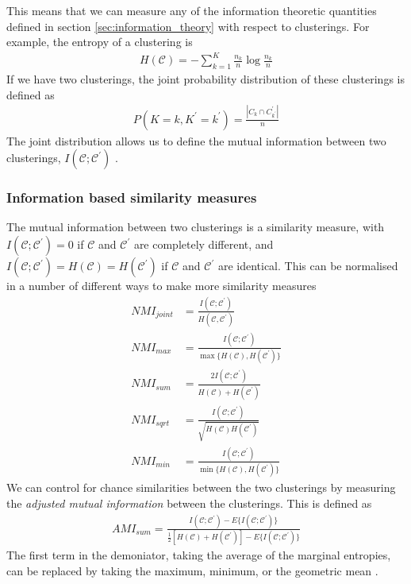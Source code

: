 \documentclass[a4paper,12pt]{article}
\theoremstyle{definition}
\begin{document}
      This means that we can measure any of the information theoretic quantities defined in section \ref{sec:information_theory} with respect to clusterings. For example, the entropy of a clustering is
      \begin{align}
          H(\mathcal{C}) = - \sum_{k=1}^K \frac{n_k}{n} \log \frac{n_k}{n}
      \end{align}
      If we have two clusterings, the joint probability distribution of these clusterings is defined as
      \begin{align}
          P(K=k,K^{\prime}=k^{\prime}) = \frac{|C_k \cap C^{\prime}_{k^\prime}|}{n}
      \end{align}
      The joint distribution allows us to define the mutual information between two clusterings, $I(\mathcal{C};\mathcal{C}^{\prime})$ \cite{meila}.

      \subsubsection{Information based similarity measures}\label{sec:information_similarity_measures}
      The mutual information between two clusterings is a similarity measure, with $I(\mathcal{C};\mathcal{C}^{\prime}) = 0$ if $\mathcal{C}$ and $\mathcal{C}^{\prime}$ are completely different, and $I(\mathcal{C};\mathcal{C}^{\prime}) = H(\mathcal{C}) = H(\mathcal{C}^{\prime})$ if $\mathcal{C}$ and $\mathcal{C}^{\prime}$ are identical. This can be normalised in a number of different ways to make more similarity measures \cite{vinh}
      \begin{align}
          NMI_{joint} &= \frac{I(\mathcal{C};\mathcal{C}^{\prime})}{H(\mathcal{C}, \mathcal{C}^{\prime})} \\
          NMI_{max} &= \frac{I(\mathcal{C};\mathcal{C}^{\prime})}{\max \lbrace H(\mathcal{C}), H(\mathcal{C}^{\prime}) \rbrace} \\
          NMI_{sum} &= \frac{2I(\mathcal{C};\mathcal{C}^{\prime})}{H(\mathcal{C}) + H(\mathcal{C}^{\prime}) } \\
          NMI_{sqrt} &= \frac{I(\mathcal{C};\mathcal{C}^{\prime})}{\sqrt{H(\mathcal{C}) H(\mathcal{C}^{\prime}) }} \\
          NMI_{min} &= \frac{I(\mathcal{C};\mathcal{C}^{\prime})}{\min \lbrace H(\mathcal{C}), H(\mathcal{C}^{\prime}) \rbrace}
      \end{align}
      We can control for chance similarities between the two clusterings by measuring the \textit{adjusted mutual information} between the clusterings. This is defined as
      \begin{align}
        AMI_{sum} = \frac{I(\mathcal{C};\mathcal{C}^{\prime}) - E \lbrace I(\mathcal{C};\mathcal{C}^{\prime}) \rbrace}{\frac{1}{2}\left[ H(\mathcal{C}) + H(\mathcal{C}^{\prime})\right] - E \lbrace I(\mathcal{C};\mathcal{C}^{\prime})  \rbrace}
      \end{align}
      The first term in the demoniator, taking the average of the marginal entropies, can be replaced by taking the maximum, minimum, or the geometric mean \cite{vinh}.
\end{document}
